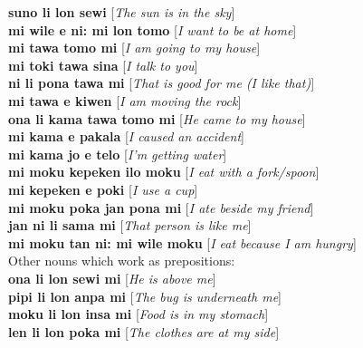 \documentclass[10pt,a4paper]{article}
\begin{document}
\begin{multicols}{2}
\noindent\textbf{suno li lon sewi} [\textit{The sun is in the sky}]\\
\noindent\textbf{mi wile e ni: mi lon tomo} [\textit{I want to be at home}]\\
\noindent\textbf{mi tawa tomo mi} [\textit{I am going to my house}]\\
\noindent\textbf{mi toki tawa sina} [\textit{I talk to you}]\\
\noindent\textbf{ni li pona tawa mi} [\textit{That is good for me (I like that)}]\\
\noindent\textbf{mi tawa e kiwen} [\textit{I am moving the rock}]\\
\noindent\textbf{ona li kama tawa tomo mi} [\textit{He came to my house}]\\
\noindent\textbf{mi kama e pakala} [\textit{I caused an accident}]\\
\noindent\textbf{mi kama jo e telo} [\textit{I'm getting water}]\\
\noindent\textbf{mi moku kepeken ilo moku} [\textit{I eat with a fork/spoon}]\\
\noindent\textbf{mi kepeken e poki} [\textit{I use a cup}]\\
\noindent\textbf{mi moku poka jan pona mi} [\textit{I ate beside my friend}]\\
\noindent\textbf{jan ni li sama mi} [\textit{That person is like me}]\\
\noindent\textbf{mi moku tan ni: mi wile moku} [\textit{I eat because I am hungry}]\\
\noindent Other nouns which work as prepositions:\\
\noindent\textbf{ona li lon sewi mi} [\textit{He is above me}]\\
\noindent\textbf{pipi li lon anpa mi} [\textit{The bug is underneath me}]\\
\noindent\textbf{moku li lon insa mi} [\textit{Food is in my stomach}]\\
\noindent\textbf{len li lon poka mi} [\textit{The clothes are at my side}]
\end{multicols}
\end{document}
